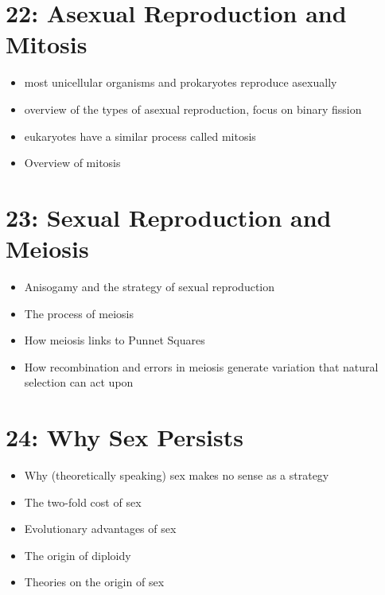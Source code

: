 \documentclass[
]{report}
\providecommand{\tightlist}{%
  \setlength{\itemsep}{0pt}\setlength{\parskip}{0pt}}
\providecommand{\tightlist}{%
  \setlength{\itemsep}{0pt}\setlength{\parskip}{0pt}}
\begin{document}
\hypertarget{asexual-reproduction-and-mitosis}{%
\section*{22: Asexual Reproduction and Mitosis}\label{asexual-reproduction-and-mitosis}}

\begin{itemize}
\tightlist
\item
  most unicellular organisms and prokaryotes reproduce asexually
\item
  overview of the types of asexual reproduction, focus on binary fission
\item
  eukaryotes have a similar process called mitosis
\item
  Overview of mitosis
\end{itemize}

\hypertarget{sexual-reproduction-and-meiosis}{%
\section*{23: Sexual Reproduction and Meiosis}\label{sexual-reproduction-and-meiosis}}

\begin{itemize}
\tightlist
\item
  Anisogamy and the strategy of sexual reproduction
\item
  The process of meiosis
\item
  How meiosis links to Punnet Squares
\item
  How recombination and errors in meiosis generate variation that natural selection can act upon
\end{itemize}

\hypertarget{why-sex-persists}{%
\section*{24: Why Sex Persists}\label{why-sex-persists}}

\begin{itemize}
\tightlist
\item
  Why (theoretically speaking) sex makes no sense as a strategy
\item
  The two-fold cost of sex
\item
  Evolutionary advantages of sex
\item
  The origin of diploidy
\item
  Theories on the origin of sex
\end{itemize}
\end{document}
